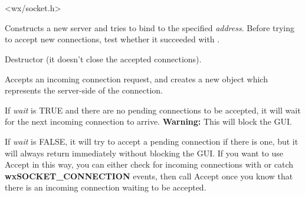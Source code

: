 \section{}\label{wxsocketserver}




<wx/socket.h>


%
%
\label{wxsocketserverconstr}


Constructs a new server and tries to bind to the specified {\it address}.
Before trying to accept new connections, test whether it succeeded with 
.




%
%


Destructor (it doesn't close the accepted connections).

%
%
\label{wxsocketserveraccept}


Accepts an incoming connection request, and creates a new 
 object which represents
the server-side of the connection.

If {\it wait} is TRUE and there are no pending connections to be
accepted, it will wait for the next incoming connection to arrive.
{\bf Warning:} This will block the GUI.

If {\it wait} is FALSE, it will try to accept a pending connection
if there is one, but it will always return immediately without blocking
the GUI. If you want to use Accept in this way, you can either check for
incoming connections with  
or catch {\bf wxSOCKET\_CONNECTION} events, then call Accept once you know
that there is an incoming connection waiting to be accepted.

